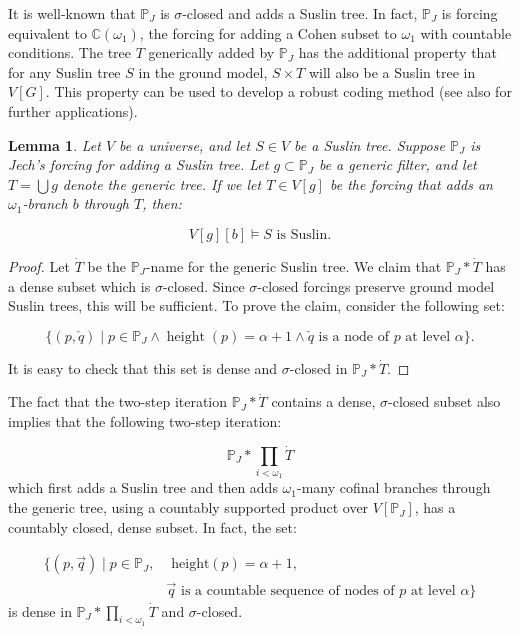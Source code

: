 \documentclass[a4paper,11pt]{article}
\newtheorem{lemma}[theorem]{Lemma}
\newcommand{\forceP}{\mathbb{P}}
\begin{document}
It is well-known that \( \forceP_J \) is \( \sigma \)-closed and adds a Suslin tree. In fact, \( \forceP_J \) is forcing equivalent to \( \mathbb{C}(\omega_1) \), the forcing for adding a Cohen subset to \( \omega_1 \) with countable conditions. The tree \( T \) generically added by \( \forceP_J \) has the additional property that for any Suslin tree \( S \) in the ground model, \( S \times T \) will also be a Suslin tree in \( V[G] \). This property can be used to develop a robust coding method (see also \cite{Ho} for further applications).

\begin{lemma}\label{1 preservation of Suslin trees}
Let \( V \) be a universe, and let \( S \in V \) be a Suslin tree. Suppose \( \forceP_J \) is Jech’s forcing for adding a Suslin tree. Let \( g \subset \forceP_J \) be a generic filter, and let \( T = \bigcup g \) denote the generic tree. If we let \( T \in V[g] \) be the forcing that adds an \( \omega_1 \)-branch \( b \) through \( T \), then:

\[
V[g][b] \models S \text{ is Suslin.}
\]
\end{lemma}

\begin{proof}
Let \( \dot{T} \) be the \( \forceP_J \)-name for the generic Suslin tree. We claim that \( \forceP_J \ast \dot{T} \) has a dense subset which is \( \sigma \)-closed. Since \( \sigma \)-closed forcings preserve ground model Suslin trees, this will be sufficient. To prove the claim, consider the following set:

\[
\{ (p, \check{q}) \mid p \in \forceP_J \land \operatorname{height}(p) = \alpha+1 \land \check{q} \text{ is a node of } p \text{ at level } \alpha \}.
\]

It is easy to check that this set is dense and \( \sigma \)-closed in \( \forceP_J \ast \dot{T} \).
\end{proof}


The fact that the two-step iteration \( \forceP_J \ast \dot{T} \) contains a dense, \( \sigma \)-closed subset also implies that the following two-step iteration:

\[
\forceP_J \ast \prod_{i < \omega_1} \dot{T}
\]
which first adds a Suslin tree and then adds \( \omega_1 \)-many cofinal branches through the generic tree, using a countably supported product over \( V[\forceP_J] \), has a countably closed, dense subset. In fact, the set:

\begin{align*}
\{ (p, \vec{q}) \mid p \in \forceP_J, &\text{ height}(p) = \alpha + 1, \,  \\& \vec{q} \text{ is a countable sequence of nodes of } p \text{ at level } \alpha \}
\end{align*}
is dense in \( \forceP_J \ast \prod_{i < \omega_1} \dot{T} \) and \( \sigma \)-closed.
\end{document}
